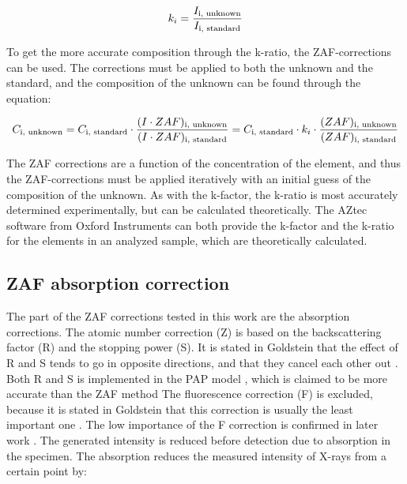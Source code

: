 \begin{equation}
    \label{eq:theory:quantitative:k_ratio}
    k_i = \frac{I_\textnormal{i, unknown}}{I_\textnormal{i, standard}}
\end{equation}


To get the more accurate composition through the k-ratio, the ZAF-corrections can be used.
The corrections must be applied to both the unknown and the standard, and the composition of the unknown can be found through the equation:

\begin{equation}
    \label{eq:theory:quantitative:k_ratio_ZAF}
    C_\textnormal{i, unknown} = C_\textnormal{i, standard} \cdot  \frac{(I \cdot ZAF)_\textnormal{i, unknown}}{(I \cdot ZAF)_\textnormal{i, standard}} = C_\textnormal{i, standard} \cdot k_i \cdot \frac{(ZAF)_\textnormal{i, unknown}}{(ZAF)_\textnormal{i, standard}}
\end{equation}

The ZAF corrections are a function of the concentration of the element, and thus the ZAF-corrections must be applied iteratively with an initial guess of the composition of the unknown.
As with the k-factor, the k-ratio is most accurately determined experimentally, but can be calculated theoretically.
The AZtec software from Oxford Instruments \cite{aztec_manual} can both provide the k-factor and the k-ratio for the elements in an analyzed sample, which are theoretically calculated.










\subsection{ZAF absorption correction}
\label{theory:quantitative:zaf}

The part of the ZAF corrections tested in this work are the absorption corrections.
The atomic number correction (Z) is based on the backscattering factor (R) and the stopping power (S).
It is stated in Goldstein that the effect of R and S tends to go in opposite directions, and that they cancel each other out \cite[p. 300]{goldstein_scanning_2018}.
Both R and S is implemented in the PAP model \cite{pap_1991}, which is claimed to be more accurate than the ZAF method \cite{pap_1991,bastin_proza96_1998,goldstein_scanning_2018}
The fluorescence correction (F) is excluded, because it is stated in Goldstein that this correction is usually the least important one \cite[p. 307]{goldstein_scanning_2018}.
The low importance of the F correction is confirmed in later work \cite{burdet_2014_3dsem}.
The generated intensity is reduced before detection due to absorption in the specimen.
The absorption reduces the measured intensity of X-rays from a certain point by:

